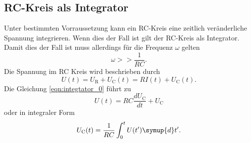 \subsection{RC-Kreis als Integrator}
Unter bestimmten Vorraussetzung kann ein RC-Kreis eine zeitlich veränderliche Spannung integrieren.
Wenn dies der Fall ist gilt der RC-Kreis als Integrator.
Damit dies der Fall ist muss allerdings für die Frequenz $\omega$ gelten
\begin{equation*}
    \omega >> \frac{1}{RC}.
\end{equation*} 
Die Spannung im RC Kreis wird beschrieben durch
\begin{equation}
    U(t) = U_\text{R}+U_\text{C}(t) = R I(t) + U_\text{C}(t).
    \label{eqn:integtator_0}
\end{equation}
Die Gleichung \eqref{eqn:integtator_0} führt zu
\begin{equation*}
    U(t) = RC \frac{dU_\text{C}}{dt}+U_\text{C}
\end{equation*}
oder in integraler Form 
\begin{equation}
    U_\text{C}(t) = \frac{1}{RC} \int_0^t  U(t') \symup{d}t'.
    \label{eqn:integator}
\end{equation}